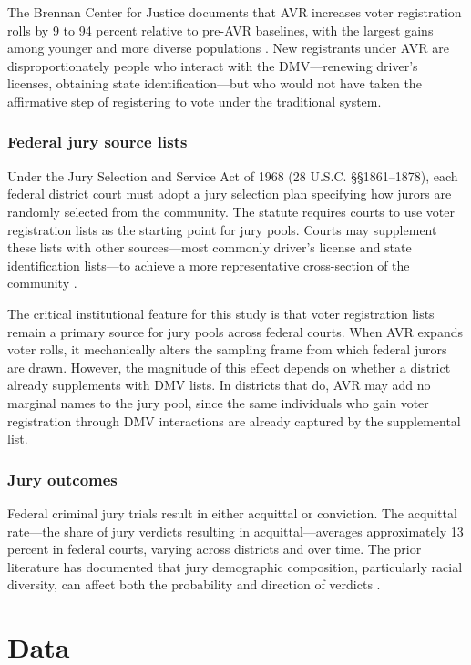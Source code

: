 \documentclass[12pt]{article}
\begin{document}
The Brennan Center for Justice documents that AVR increases voter registration rolls by 9 to 94 percent relative to pre-AVR baselines, with the largest gains among younger and more diverse populations \citep{brennan2023avr}. New registrants under AVR are disproportionately people who interact with the DMV---renewing driver's licenses, obtaining state identification---but who would not have taken the affirmative step of registering to vote under the traditional system.

\subsubsection*{Federal jury source lists} Under the Jury Selection and Service Act of 1968 (28 U.S.C. \S\S 1861--1878), each federal district court must adopt a jury selection plan specifying how jurors are randomly selected from the community. The statute requires courts to use voter registration lists as the starting point for jury pools. Courts may supplement these lists with other sources---most commonly driver's license and state identification lists---to achieve a more representative cross-section of the community \citep{herron2018jury, grosso2015racial}.

The critical institutional feature for this study is that voter registration lists remain a primary source for jury pools across federal courts. When AVR expands voter rolls, it mechanically alters the sampling frame from which federal jurors are drawn. However, the magnitude of this effect depends on whether a district already supplements with DMV lists. In districts that do, AVR may add no marginal names to the jury pool, since the same individuals who gain voter registration through DMV interactions are already captured by the supplemental list.

\subsubsection*{Jury outcomes} Federal criminal jury trials result in either acquittal or conviction. The acquittal rate---the share of jury verdicts resulting in acquittal---averages approximately 13 percent in federal courts, varying across districts and over time. The prior literature has documented that jury demographic composition, particularly racial diversity, can affect both the probability and direction of verdicts \citep{anwar2012impact, sommers2006race, cohen2015effect, bowers2001jury}.

\section{Data}
\end{document}

